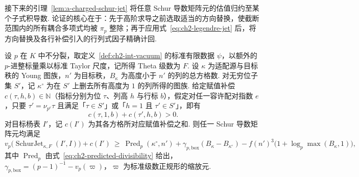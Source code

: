 接下来的引理~\ref{lem:a-charged-schur-jet} 将任意 Schur 导数矩阵元的估值归约至某个子式积导数. 论证的核心在于：先于高阶求导之前选取适当的方向替换，使截断范围内的所有耦合多项式均被 $\pi_p$ 整除；再于应用式~\eqref{eq:ch2-legendre-jet} 后，将方向替换及各行补偿引入的行列式因子精确计回.

\begin{lemma}
\label{lem:a-charged-schur-jet}
\label{thm:ch2-jet-count}
\emitthmsource
设 $p$ 在 $K$ 中不分裂，取定义~\ref{def:ch2-int-vacuum} 的标准有限数据 $\psi$，以额外的 $p$-进整标量乘以标准 Taylor 尺度，记所得 Theta 级数为 $F$. 设 $\kappa$ 为适配源与目标秩的 Young 图族，$n'$ 为目标秩，$B_\kappa$ 为高度小于 $n'$ 的列的总方格数. 对无穷位子集 $S'$，记 $\kappa^\circ$ 为在 $S'$ 上删去所有高度为 $1$ 的列所得的图族. 给定赋值补偿 $c(\tau,h,b)\in\mathbb N$（指标分别为位 $\tau$、列高 $h$ 与行标 $b$），假定对任一容许配对指数 $e$，只要 $\tau'=\nu_{p^e}\tau$ 且满足「$\tau\in S'$」或「$h=1$ 且 $\tau'\in S'$」，即有
\[
             c(\tau,1,b)+c(\tau',h,b)>0.
\]
对目标杨表 $I'$，记 $c(I')$ 为其各方格所对应赋值补偿之和. 则任一 Schur 导数矩阵元均满足
\[
 v_p\bigl(\operatorname{SchurJet}_{\kappa,F}(I',I)\bigr)+c(I')
 \ \ge\
 \operatorname{Pred}_p(\kappa^\circ,n')
 +\gamma_{p,\mathrm{box}}(B_\kappa-B_{\kappa^\circ})
 - f(n')^3\bigl(1+\log_p\max(B_\kappa,1)\bigr),
\]
其中 $\operatorname{Pred}_p$ 由式~\eqref{eq:ch2-predicted-divisibility} 给出，$\gamma_{p,\mathrm{box}}=(p-1)^{-1}-v_p(\varpi)$，$\varpi$ 为标准级数正规形的缩放元.
\end{lemma}

